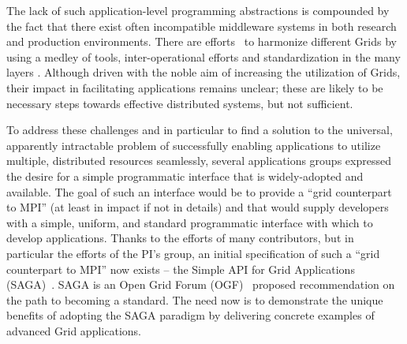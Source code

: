 \documentclass[10pt,letterpaper]{article}
\begin{document}

The lack of such application-level programming abstractions is
compounded by the fact that there exist often incompatible middleware
systems in both research and production environments.  There are
efforts~\cite{gin-bes-hpc} to harmonize different Grids by using a
medley of tools, inter-operational efforts and standardization in the
many layers .  Although driven with the
noble aim of increasing the utilization of Grids, their impact in
facilitating applications remains unclear; these are likely to be
necessary steps towards effective distributed systems, but not
sufficient.

To address these challenges and in particular to find a solution to
the universal, apparently intractable problem of successfully enabling
applications to utilize multiple, distributed resources seamlessly,
several applications groups expressed the desire for a simple
programmatic interface that is widely-adopted and available.  The goal
of such an interface would be to provide a ``grid counterpart to MPI''
(at least in impact if not in details) and that would supply
developers with a simple, uniform, and standard programmatic interface
with which to develop applications.  Thanks to the efforts of many
contributors, but in particular the efforts of the PI's group, an
initial specification of such a ``grid counterpart to MPI'' now exists
-- the Simple API for Grid Applications (SAGA)~\cite{saga-core}. SAGA
is an Open Grid Forum (OGF)~\cite{ogf} proposed recommendation on the
path to becoming a standard.  The need now is to demonstrate the
unique benefits of adopting the SAGA paradigm by delivering concrete
examples of advanced Grid applications.

\end{document}
